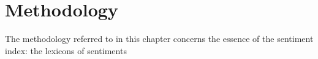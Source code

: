 \chapter{\textbf{Methodology}} \label{cap:methodology}

The methodology referred to in this chapter concerns the essence of the sentiment index: the lexicons of sentiments








